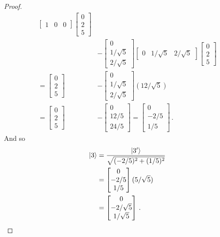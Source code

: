 \begin{proof}
\begin{align}
\begin{bmatrix}
    1 & 0 & 0
    \end{bmatrix}
    \begin{bmatrix}
    0 \\
    2 \\
    5
    \end{bmatrix} \\
    &-
    \begin{bmatrix}
    0 \\
    1/\sqrt{5} \\
    2/\sqrt{5}
    \end{bmatrix}
    \begin{bmatrix}
    0 & 1/\sqrt{5} & 2/\sqrt{5}
    \end{bmatrix}
    \begin{bmatrix}
    0 \\
    2 \\
    5
    \end{bmatrix} \\
    =
    \begin{bmatrix}
    0 \\
    2 \\
    5
    \end{bmatrix}
    &-
    \begin{bmatrix}
    0 \\
    1/\sqrt{5} \\
    2/\sqrt{5}
    \end{bmatrix}
    (12/\sqrt{5}) \\
    = 
    \begin{bmatrix}
    0 \\
    2 \\
    5
    \end{bmatrix}
    &- 
    \begin{bmatrix}
    0 \\
    12/5 \\
    24/5
    \end{bmatrix} 
    =
    \begin{bmatrix}
    0 \\
    -2/5 \\
    1/5
    \end{bmatrix}\,.
\end{align}
And so
\begin{align}
    \ket{3} &= \frac{\ket{3'}}{\sqrt{(-2/5)^2 + (1/5)^2}} \\
    &= 
    \begin{bmatrix}
    0 \\
    -2/5 \\
    1/5
    \end{bmatrix}
    (5/\sqrt{5}) \\
    &= 
    \begin{bmatrix}
    0 \\
    -2/\sqrt{5} \\
    1/\sqrt{5}
    \end{bmatrix}\,.
\end{align}
\end{proof}

